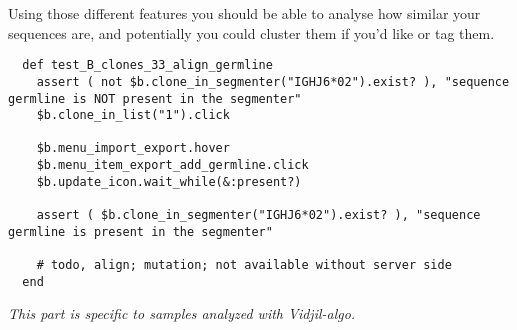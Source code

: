 Using those different features you should be able to analyse how similar your
sequences are, and potentially you could cluster them if you'd like or tag them.

\begin{verbatim}
  def test_B_clones_33_align_germline
    assert ( not $b.clone_in_segmenter("IGHJ6*02").exist? ), "sequence germline is NOT present in the segmenter"
    $b.clone_in_list("1").click

    $b.menu_import_export.hover
    $b.menu_item_export_add_germline.click
    $b.update_icon.wait_while(&:present?)

    assert ( $b.clone_in_segmenter("IGHJ6*02").exist? ), "sequence germline is present in the segmenter"

    # todo, align; mutation; not available without server side
  end
\end{verbatim}

\bigskip

\textit{This part is specific to samples analyzed with Vidjil-algo.}

